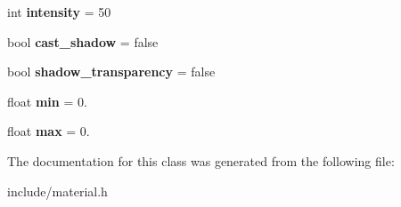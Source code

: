 \begin{DoxyCompactItemize}
int {\bfseries intensity} = 50
\item 
\mbox{\label{classmaterial_aafeb36f836908481e64464807dba6a63}} 
bool {\bfseries cast\+\_\+shadow} = false
\item 
\mbox{\label{classmaterial_a011488b6f2999635cd62d61e1edb109b}} 
bool {\bfseries shadow\+\_\+transparency} = false
\item 
\mbox{\label{classmaterial_a1570607560ba31306b12323aa928f92e}} 
float {\bfseries min} = 0.
\item 
\mbox{\label{classmaterial_aee71636124c85fe10d6f53e003ef247b}} 
float {\bfseries max} = 0.
\end{DoxyCompactItemize}


The documentation for this class was generated from the following file\+:\begin{DoxyCompactItemize}
\item 
include/material.\+h\end{DoxyCompactItemize}
